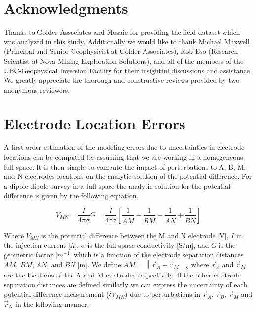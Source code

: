 \documentclass[final,authoryear,5p,times,twocolumn]{elsarticle}
\begin{document}
\section{Acknowledgments}
\label{Acknowledgments}
Thanks to Golder Associates and Mosaic for providing the field dataset which was analyzed in this study. Additionally we would like to thank Michael Maxwell (Principal and Senior Geophysicist at Golder Associates), Rob Eso (Research Scientist at Nova Mining Exploration Solutions), and all of the members of the UBC-Geophysical Inversion Facility for their insightful discussions and assistance. We greatly appreciate the thorough and constructive reviews provided by two anonymous reviewers.

\appendix

\section{Electrode Location Errors}
\label{Appen:ElecLocErr}
A first order estimation of the modeling errors due to uncertainties in electrode locations can be computed by assuming that we are working in a homogeneous full-space. It is then simple to compute the impact of perturbations to A, B, M, and N electrodes locations on the analytic solution of the potential difference. For a dipole-dipole survey in a full space the analytic solution for the potential difference is given by the following equation.

\begin{equation}
 V_{MN} = \frac{I}{4 \pi \sigma} G = \frac{I}{4 \pi \sigma} \left[ \frac{1}{\overline{AM}} - \frac{1}{\overline{BM}} - \frac{1}{\overline{AN}} + \frac{1}{\overline{BN}} \right]
\end{equation}

Where  $V_{MN}$ is the potential difference between the M and N electrode [V], $I$ in the injection current [A], $\sigma$ is the full-space conductivity [S/m], and $G$ is the geometric factor [$m^{-1}$] which is a function of the electrode separation distances $\overline{AM}$, $\overline{BM}$, $\overline{AN}$, and $\overline{BN}$ [m]. We define $\overline{AM} = \left\| \vec{r}_{A} - \vec{r}_{M} \right\|_{2}$ where $\vec{r}_{A}$ and $\vec{r}_{M}$ are the locations of the A and M electrodes respectively. If the other electrode separation distances are defined similarly we can express the uncertainty of each potential difference measurement ($\delta V_{MN}$) due to perturbations in $\vec{r}_{A}$, $\vec{r}_{B}$, $\vec{r}_{M}$ and $\vec{r}_{N}$ in the following manner.
\end{document}
